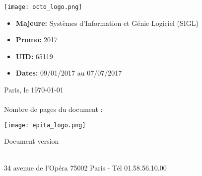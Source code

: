 %
%

\pagestyle{fancy}
\thispagestyle{empty}

\begin{spacing}{1.5}%
    \center
    \texttt{[image: octo\_logo.png]}\\%
    {\fontsize{16}{18}\selectfont {}}%
\end{spacing}%

\vspace{1 cm}
\noindent\begin{minipage}[t]{6cm}
    \begin{itemize}[label=, leftmargin=*, itemsep=0pt]
        \item \textbf{Majeure:} Systèmes d'Information et Génie Logiciel (SIGL)
        \item \textbf{Promo:} 2017
        \item \textbf{UID:} 65119
        \item \textbf{Dates:} 09/01/2017 au 07/07/2017
    \end{itemize}
\end{minipage}
\hfill
\begin{minipage}[t]{5.4cm}
    \begin{flushleft}
        \begin{spacing}{1.8}
            Paris, le \today\\
            \No \textsc{}\\
            Nombre de pages du document : \pageref{LastPage}
        \end{spacing}
    \end{flushleft}
\end{minipage}

\vspace{1cm}

\begin{flushright}
    {\Huge \title\\}
    \hrulefill \\ \vspace{0.5 cm}
    {\LARGE \subtitle}
\end{flushright}
\vspace{1.5 cm}

\begin{center}
    \texttt{[image: epita\_logo.png]}%
    \vspace{0.5 cm}

    \vspace{4.5cm}

    \begin{small}
        Document version \version{}
    \end{small} \\
    {\scriptsize 34 avenue de l'Opéra 75002 Paris - Tél 01.58.56.10.00}
\end{center}

\newpage

